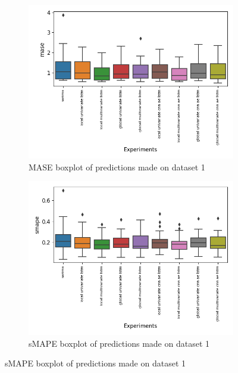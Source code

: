 \begin{figure}[h!]
  \centering
  \begin{subfigure}[b]{0.49\textwidth}
    \includegraphics[width=\textwidth]{./figs/results/boxplot/mase-dataset_1.png}
    \hfill
    \caption{MASE boxplot of predictions made on dataset 1}
    \label{fig:results:boxplot-mase-dataset-1-mase}
  \end{subfigure}
  \begin{subfigure}[b]{0.49\textwidth}
    \includegraphics[width=\textwidth]{./figs/results/boxplot/smape-dataset_1.png}
    \hfill
    \caption{sMAPE boxplot of predictions made on dataset 1}
    \label{fig:results:boxplot-mase-dataset-1-smape}

  \end{subfigure}
\end{figure}

